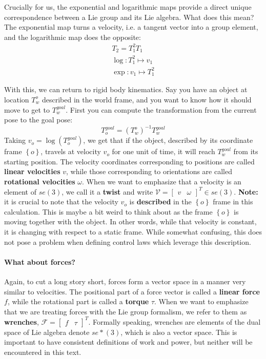 Crucially for us, the exponential and logarithmic maps provide a direct
unique correspondence between a Lie group and its Lie algebra.
What does this mean? The exponential map turns a velocity,
i.e. a tangent vector into a group element, and the logarithmic map does the opposite:
\begin{gather}
T_{ 2 } = T_{ 1 }^{ 2 }T_{ 1 } \\
\log:  T_{ 1 }^{ 2 }\mapsto v_{ 1 } \\
\exp: v_{ 1 } \mapsto T_{ 1 }^{ 2 } 
\end{gather}

With this, we can return to rigid body kinematics.
Say you have an object at location
$ T_{ w }^{ o }  $ described in the world frame,
and you want to know how it should move to get to $ T_{ w }^{ goal }  $.
First you can compute the transformation from the current pose to the goal pose:
\begin{equation}
T_{ o }^{ goal } = (T_{ w }^{ o })^{ -1 } T_{ w }^{ goal }
\end{equation}
Taking $ v_{ o } = \log (T_{ o }^{ goal })  $, we get that 
if the object, described by its coordinate frame $ \left\{ o \right\}   $,
travels at velocity $ v_{ o }  $ for one unit of time,
it will reach $ T_{ w }^{ goal }  $ from its starting position.
The velocity coordinates corresponding to positions are called
\textbf{linear velocities} $ v  $, while those corresponding to orientations
are called \textbf{rotational velocities} $ \omega  $.
When we want to emphasize that a velocity is an element of $ se (3)  $,
we call it a \textbf{twist} and write $ \mathcal{V} = 
\begin{bmatrix} v & \omega \end{bmatrix}^{ T } \in se (3) $.
\textbf{Note:} it is crucial to note that the velocity $ v_{ o }  $
is \textbf{described}  in the $ \left\{ o \right\}   $ frame in this calculation.
This is maybe a bit weird to think about as the frame $ \left\{ o \right\}   $
is moving together with the object. In other words, while that velocity is constant,
it is changing with respect to a static frame.
While somewhat confusing, this does not pose a problem when defining 
control laws which leverage this description.

\paragraph{What about forces?}
Again, to cut a long story short, forces form a vector space
in a manner very similar to velocities.
The positional part of a force vector is called a \textbf{linear force} $ f  $,
while the rotational part is called a \textbf{torque} $ \tau  $.
When we want to emphasize that we are treating forces with
the Lie group formalism, we refer to them as \textbf{wrenches},
$ \mathcal{F} = \begin{bmatrix} f & \tau \end{bmatrix} ^{ T }   $.
Formally speaking, wrenches are elements of the dual space of 
Lie algebra denote $ se*(3)  $, which is also a vector space.
This is important to have consistent definitions of work and power,
but neither will be encountered in this text.

